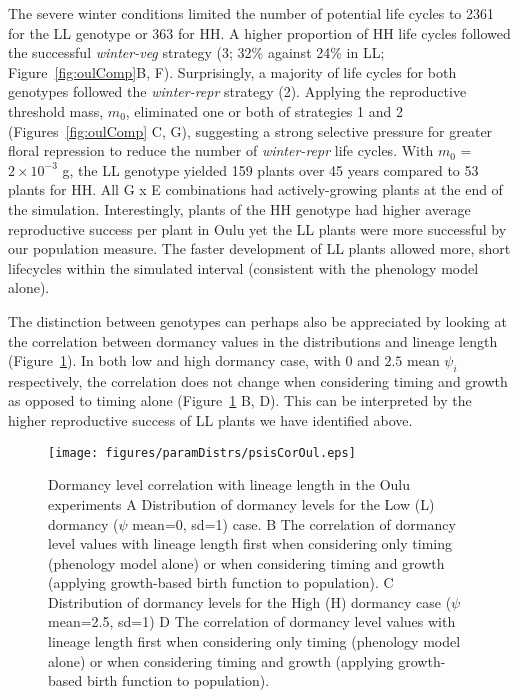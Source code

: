 The severe winter conditions limited the number of potential life cycles to 2361
for the LL genotype or 363 for HH. A higher proportion of HH life cycles
followed the successful \emph{winter-veg} strategy (3; 32\% against 24\% in LL;
Figure~\ref{fig:oulComp}B, F). Surprisingly, a majority of life cycles for both
genotypes followed the \emph{winter-repr} strategy (2).  Applying the
reproductive threshold mass, \(m_{0}\), eliminated one or both of strategies 1
and 2 (Figures~\ref{fig:oulComp} C, G), suggesting a strong selective pressure
for greater floral repression to reduce the number of \emph{winter-repr} life
cycles. With \(m_{0}\) = \(2 \times 10^{- 3}\) g, the LL genotype yielded 159
plants over 45 years compared to 53 plants for HH. All G x E combinations had
actively-growing plants at the end of the simulation. Interestingly, plants of
the HH genotype had higher average reproductive success per plant in Oulu yet
the LL plants were more successful by our population measure. The faster
development of LL plants allowed more, short lifecycles within the simulated
interval (consistent with the phenology model alone).

The distinction between genotypes can perhaps also be appreciated by looking at
the correlation between dormancy values in the distributions and lineage length
(Figure~\ref{fig:psisCorOul}). In both low and high dormancy case, with $0$ and
$2.5$ mean $\psi_i$ respectively, the correlation does not change when
considering timing and growth as opposed to timing alone
(Figure~\ref{fig:psisCorOul} B, D). This can be interpreted by the higher
reproductive success of LL plants we have identified above.

\begin{figure}[tb]
  \centering
  \texttt{[image: figures/paramDistrs/psisCorOul.eps]}
  \caption{Dormancy level correlation with lineage length in the Oulu
    experiments A Distribution of dormancy levels for the Low (L) dormancy
    ($\psi$ mean=0, sd=1) case. B The correlation of dormancy level values with
    lineage length first when considering only timing (phenology model alone) or
    when considering timing and growth (applying growth-based birth function to
    population). C Distribution of dormancy levels for the High (H) dormancy
    case ($\psi$ mean=2.5, sd=1) D The correlation of dormancy level values with
    lineage length first when considering only timing (phenology model alone) or
    when considering timing and growth (applying growth-based birth function to
    population).}
  \label{fig:psisCorOul}
\end{figure}

